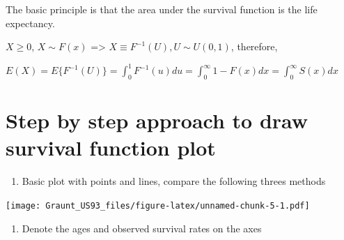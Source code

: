 \documentclass[
]{article}
\newenvironment{Shaded}{\begin{snugshade}}{\end{snugshade}}
\newcommand{\AttributeTok}[1]{\textcolor[rgb]{0.77,0.63,0.00}{#1}}
\newcommand{\ConstantTok}[1]{\textcolor[rgb]{0.00,0.00,0.00}{#1}}
\newcommand{\DecValTok}[1]{\textcolor[rgb]{0.00,0.00,0.81}{#1}}
\newcommand{\FunctionTok}[1]{\textcolor[rgb]{0.00,0.00,0.00}{#1}}
\newcommand{\NormalTok}[1]{#1}
\newcommand{\SpecialCharTok}[1]{\textcolor[rgb]{0.00,0.00,0.00}{#1}}
\newcommand{\StringTok}[1]{\textcolor[rgb]{0.31,0.60,0.02}{#1}}
\providecommand{\tightlist}{%
  \setlength{\itemsep}{0pt}\setlength{\parskip}{0pt}}
\begin{document}
The basic principle is that the area under the survival function is the
life expectancy.

\(X \ge 0\), \(X \sim F(x)\) =\textgreater{}
\(X \equiv F^{-1}(U), U \sim U(0,1)\), therefore,

\(E(X) = E\{F^{-1}(U)\} = \int_{0}^{1} F^{-1}(u)du = \int_0^{\infty} 1-F(x) dx = \int_{0}^{\infty} S(x) dx\)

\hypertarget{step-by-step-approach-to-draw-survival-function-plot}{%
\section{Step by step approach to draw survival function
plot}\label{step-by-step-approach-to-draw-survival-function-plot}}

\begin{enumerate}
\def\labelenumi{\arabic{enumi}.}
\tightlist
\item
  Basic plot with points and lines, compare the following threes methods
\end{enumerate}

\begin{Shaded}
\end{Shaded}

\texttt{[image: Graunt\_US93\_files/figure-latex/unnamed-chunk-5-1.pdf]}

\begin{enumerate}
\def\labelenumi{\arabic{enumi}.}
\setcounter{enumi}{1}
\tightlist
\item
  Denote the ages and observed survival rates on the axes
\end{enumerate}
\end{document}
